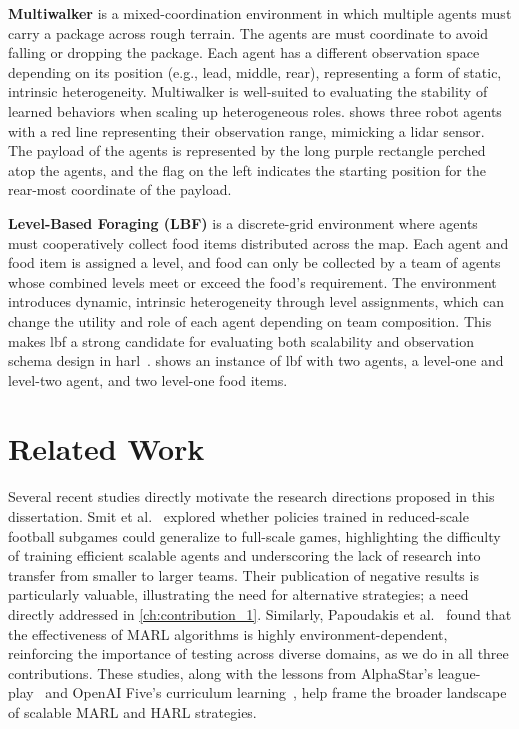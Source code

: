\textbf{Multiwalker} is a mixed-coordination environment in which 
multiple agents must carry a package across rough terrain. 
The agents are must coordinate to avoid falling or dropping the package. 
Each agent has a different observation space depending on its position 
(e.g., lead, middle, rear), representing a form of static, intrinsic heterogeneity. 
Multiwalker is well-suited to evaluating the stability of learned 
behaviors when scaling up heterogeneous roles.
 shows three robot agents with a red line 
representing their observation range, mimicking a \gls{lidar} sensor.
The payload of the agents is represented by the long purple rectangle 
perched atop the agents, and the flag on the left indicates the starting 
position for the rear-most coordinate of the payload.

\textbf{Level-Based Foraging (LBF)} is a discrete-grid environment where 
agents must cooperatively collect food items distributed across the map. 
Each agent and food item is assigned a level, and food can only be 
collected by a team of agents whose combined levels meet or exceed 
the food's requirement. The environment introduces dynamic, intrinsic 
heterogeneity through level assignments, which can change the utility 
and role of each agent depending on team composition. 
This makes \gls{lbf} a strong candidate for evaluating both 
scalability and observation schema design in \gls{harl}~\cite{papoudakis2021}.
 shows an instance of \gls{lbf} with two agents,
a level-one and level-two agent, and two level-one food items.


\section{Related Work}

Several recent studies directly motivate the research directions proposed in this dissertation. 
Smit et al.~\cite{smit2023} explored whether policies trained in reduced-scale football 
subgames could generalize to full-scale games, highlighting the difficulty of training 
efficient scalable agents and underscoring the lack of research into transfer from 
smaller to larger teams. Their publication of negative results is particularly valuable, 
illustrating the need for alternative strategies;
a need directly addressed in \cref{ch:contribution_1}.
Similarly, Papoudakis et al.~\cite{papoudakis2021} found that the effectiveness of MARL 
algorithms is highly environment-dependent, reinforcing the importance of testing across 
diverse domains, as we do in all three contributions. 
These studies, along with the lessons from AlphaStar's league-play~\cite{vinyals2019} 
and OpenAI Five's curriculum learning~\cite{berner2019}, help frame the broader 
landscape of scalable MARL and HARL strategies.

